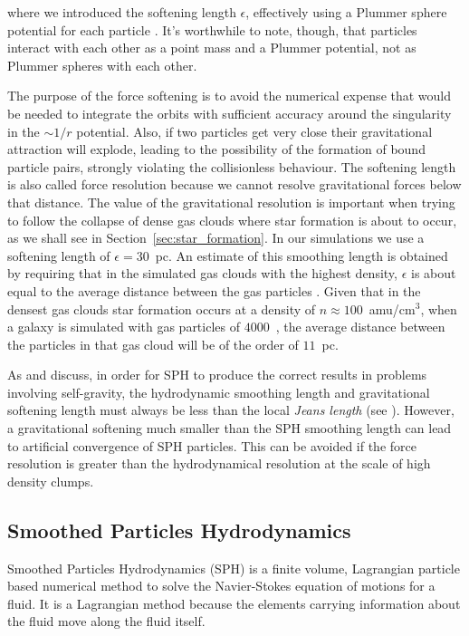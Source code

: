 where we introduced the softening length $\epsilon$, effectively using a Plummer sphere potential for each particle \citep{Plummer1911}.
It's worthwhile to note, though, that particles interact with each other as a point mass and a Plummer potential, not as Plummer spheres with each other.

The purpose of the force softening is to avoid the numerical expense that would be needed to integrate the orbits with sufficient accuracy around the singularity in the $\sim 1/r$ potential.
Also, if two particles get very close their gravitational attraction will explode, leading to the possibility of the formation of bound particle pairs, strongly violating the collisionless behaviour.
The softening length is also called force resolution because we cannot resolve gravitational forces below that distance.
The value of the gravitational resolution is important when trying to follow the collapse of dense gas clouds where star formation is about to occur, as we shall see in Section~\ref{sec:star_formation}.
In our simulations we use a softening length of $\epsilon=30$~pc.
An estimate of this smoothing length is obtained by requiring that in the simulated gas clouds with the highest density, $\epsilon$ is about equal to the average distance between the gas particles \citep{Schroyen2013}. %
Given that in the densest gas clouds star formation occurs at a density of $n\approx100$~amu/cm$^{3}$, when a galaxy is simulated with gas particles of $4000$~\Msun{}, the average distance between the particles in that gas cloud will be of the order of $11$~pc.

As \citet{Bate1997} and \citet{Springel2005} discuss, in order for SPH to produce the correct results in problems involving self-gravity, the hydrodynamic smoothing length and gravitational softening length must always be less than the local \emph{Jeans length} (see ). However, a gravitational softening much smaller than the SPH smoothing length can lead to artificial convergence of SPH particles.
This can be avoided if the force resolution is greater than the hydrodynamical resolution at the scale of high density clumps.

\subsection{Smoothed Particles Hydrodynamics}\label{sec:SPH}
Smoothed Particles Hydrodynamics (SPH) is a finite volume, Lagrangian particle based numerical method to solve the Navier-Stokes equation of motions for a fluid.
It is a Lagrangian method because the elements carrying information about the fluid move along the fluid itself.

